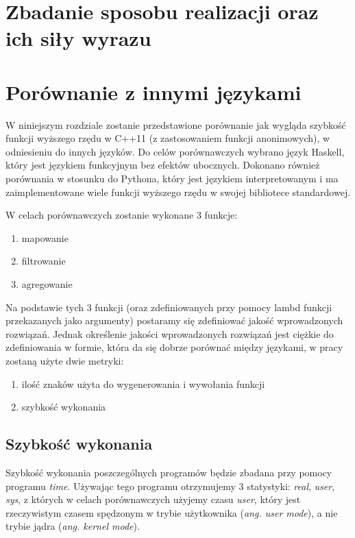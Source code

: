\documentclass{pracamgr}
\begin{document}
\chapter{Zbadanie sposobu realizacji oraz ich siły wyrazu}\label{r:SposobRealizacji}
 








\chapter{Porównanie z innymi językami}\label{r:Porownanie}

W niniejszym rozdziale zostanie przedstawione porównanie jak wygląda szybkość funkcji 
wyższego rzędu w C++11 (z zastosowaniem funkcji anonimowych), w odniesieniu do innych języków.
Do celów porównawczych wybrano język Haskell, który jest językiem funkcyjnym bez efektów ubocznych.
Dokonano również porównania w stosunku do Pythona, który jest językiem interpretowanym i 
ma zaimplementowane wiele funkcji wyższego rzędu w swojej bibliotece standardowej.

W celach porównawczych zostanie wykonane 3 funkcje:
\begin{enumerate}
  \item mapowanie
  \item filtrowanie
  \item agregowanie
\end{enumerate}

Na podstawie tych 3 funkcji (oraz zdefiniowanych przy pomocy lambd funkcji przekazanych jako argumenty) postaramy się
zdefiniować jakość wprowadzonych rozwiązań. Jednak określenie jakości wprowadzonych rozwiązań jest ciężkie do zdefiniowania
w formie, która da się dobrze porównać między językami, w pracy zostaną użyte dwie metryki:
\begin{enumerate}
  \item ilość znaków użyta do wygenerowania i wywołania funkcji
  \item szybkość wykonania
\end{enumerate}

\section{Szybkość wykonania}
Szybkość wykonania poszczególnych programów będzie zbadana przy pomocy programu \textit{time}. Używając tego programu otrzymujemy 
3 statystyki: \textit{real}, \textit{user}, \textit{sys}, z których w celach porównawczych użyjemy czasu \textit{user}, który jest 
rzeczywistym czasem spędzonym w trybie użytkownika (\textit{ang. user mode})\cite{ManTime}, a nie trybie jądra (\textit{ang. kernel mode}).
\end{document}
